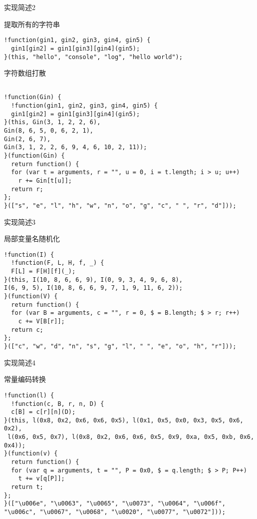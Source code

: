 \documentclass[presentation]{beamer}
\begin{document}
\begin{frame}[fragile,label=sec-7]{实现简述2}
\begin{block}{提取所有的字符串}
\begin{verbatim}
!function(gin1, gin2, gin3, gin4, gin5) {
  gin1[gin2] = gin1[gin3][gin4](gin5);
}(this, "hello", "console", "log", "hello world");
\end{verbatim}
\end{block}
\begin{block}{字符数组打散}
\begin{verbatim}

!function(Gin) {
  !function(gin1, gin2, gin3, gin4, gin5) {
  gin1[gin2] = gin1[gin3][gin4](gin5);
}(this, Gin(3, 1, 2, 2, 6), 
Gin(8, 6, 5, 0, 6, 2, 1), 
Gin(2, 6, 7), 
Gin(3, 1, 2, 2, 6, 9, 4, 6, 10, 2, 11));
}(function(Gin) {
  return function() {
  for (var t = arguments, r = "", u = 0, i = t.length; i > u; u++) 
    r += Gin[t[u]];
  return r;
};
}(["s", "e", "l", "h", "w", "n", "o", "g", "c", " ", "r", "d"]));

\end{verbatim}
\end{block}
\end{frame}
\begin{frame}[fragile,label=sec-8]{实现简述3}
\begin{block}{局部变量名随机化}
\begin{verbatim}
!function(I) {
  !function(F, L, H, f, _) {
  F[L] = F[H][f](_);
}(this, I(10, 8, 6, 6, 9), I(0, 9, 3, 4, 9, 6, 8), 
I(6, 9, 5), I(10, 8, 6, 6, 9, 7, 1, 9, 11, 6, 2));
}(function(V) {
  return function() {
  for (var B = arguments, c = "", r = 0, $ = B.length; $ > r; r++) 
    c += V[B[r]];
  return c;
};
}(["c", "w", "d", "n", "s", "g", "l", " ", "e", "o", "h", "r"]));

\end{verbatim}
\end{block}
\end{frame}
\begin{frame}[fragile,label=sec-9]{实现简述4}
\begin{block}{常量编码转换}
\begin{verbatim}
!function(l) {
  !function(c, B, r, n, D) {
  c[B] = c[r][n](D);
}(this, l(0x8, 0x2, 0x6, 0x6, 0x5), l(0x1, 0x5, 0x0, 0x3, 0x5, 0x6, 0x2),
 l(0x6, 0x5, 0x7), l(0x8, 0x2, 0x6, 0x6, 0x5, 0x9, 0xa, 0x5, 0xb, 0x6, 0x4));
}(function(v) {
  return function() {
  for (var q = arguments, t = "", P = 0x0, $ = q.length; $ > P; P++) 
    t += v[q[P]];
  return t;
};
}(["\u006e", "\u0063", "\u0065", "\u0073", "\u0064", "\u006f", 
"\u006c", "\u0067", "\u0068", "\u0020", "\u0077", "\u0072"]));

\end{verbatim}
\end{block}
\end{frame}
\end{document}
